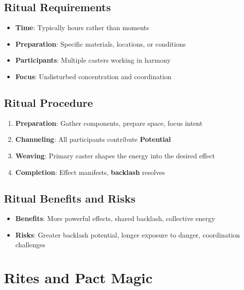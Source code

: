 \begin{multicols}{2}
\subsection*{Ritual Requirements}
\begin{itemize}
\item \textbf{Time}: Typically hours rather than moments
\item \textbf{Preparation}: Specific materials, locations, or conditions
\item \textbf{Participants}: Multiple casters working in harmony
\item \textbf{Focus}: Undisturbed concentration and coordination
\end{itemize}

\subsection*{Ritual Procedure}
\begin{enumerate}
\item \textbf{Preparation}: Gather components, prepare space, focus intent
\item \textbf{Channeling}: All participants contribute \textbf{Potential}
\item \textbf{Weaving}: Primary caster shapes the energy into the desired effect
\item \textbf{Completion}: Effect manifests, \textbf{backlash} resolves
\end{enumerate}

\subsection*{Ritual Benefits and Risks}
\begin{itemize}
\item \textbf{Benefits}: More powerful effects, shared backlash, collective energy
\item \textbf{Risks}: Greater backlash potential, longer exposure to danger, coordination challenges
\end{itemize}

\section{Rites and Pact Magic}  


\end{multicols}
